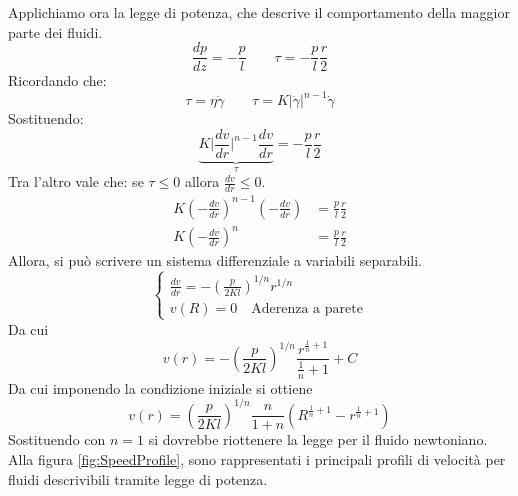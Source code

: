 Applichiamo ora la legge di potenza, che descrive il comportamento della maggior parte dei fluidi.
\begin{equation}
\frac{dp}{dz}=-\frac{p}{l} \qquad \tau = -\frac{p}{l}\frac{r}{2}
\end{equation}
Ricordando che:
\begin{equation}
\tau = \eta \dot{\gamma} \qquad \tau = K \lvert \dot{\gamma} \rvert^{n-1}\dot{\gamma}
\end{equation}
Sostituendo:
\begin{equation}
\underbrace{K \Big|\frac{dv}{dr}\Big|^{n-1}\frac{dv}{dr}}_{\tau} = -\frac{p}{l}\frac{r}{2}
\end{equation}
Tra l'altro vale che: se $\tau \leq 0$ allora $\frac{dv}{dr} \leq 0$.
\begin{equation}
\begin{split}
K \left(-\frac{dv}{dr}\right)^{n-1}\left(-\frac{dv}{dr}\right) &= \frac{p}{l}\frac{r}{2}\\
K \left(-\frac{dv}{dr}\right)^{n} &= \frac{p}{l}\frac{r}{2} 
\end{split}
\end{equation}
Allora, si può scrivere un sistema differenziale a variabili separabili.
\begin{equation}
\begin{cases}
\frac{dv}{dr}=-\left(\frac{p}{2Kl}\right)^{1/n}r^{1/n}\\
v(R) = 0 \quad \text{Aderenza a parete}
\end{cases}
\end{equation}
Da cui
\begin{equation}
v(r) = -\left(\frac{p}{2Kl}\right)^{1/n}\frac{r^{\frac{1}{n}+1}}{\frac{1}{n}+1}+C
\end{equation}
Da cui imponendo la condizione iniziale si ottiene
\begin{equation}
v(r) = \left(\frac{p}{2Kl}\right)^{1/n} \frac{n}{1+n} \left(R^{\frac{1}{n}+1} - r^{\frac{1}{n}+1}\right)
\end{equation}
Sostituendo con $n=1$ si dovrebbe riottenere la legge per il fluido newtoniano.
Alla figura \ref{fig:SpeedProfile}, sono rappresentati i principali profili di velocità per fluidi descrivibili tramite legge di potenza.

